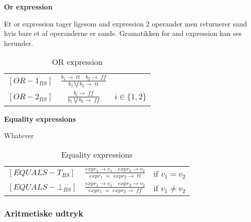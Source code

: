 \noindent\textbf{Or expression}

\noindent Et or expression tager ligesom and expression 2 operander men returnerer sand hvis bare et af operanderne er sande. Gramatikken for and expression kan ses herunder.



    \bgroup
    \def\arraystretch{3}
    \begin{table}[H]
    \centering
    \begin{tabular}{l c l}
        
        $[OR-1_{BS}]$ &$\frac{b_1 \rightarrow \; tt \quad b_2 \rightarrow \; ff}{b_1 \bigvee b_2 \rightarrow \; tt}$ & \\
    
        $[OR-2_{BS}]$ &$\frac{b_i \rightarrow \; ff}{b_1 \bigvee b_2 \rightarrow \; ff}$ & $i \in \{1, 2\}$\\
        
    \end{tabular}
    \caption{OR expression}
    \label{tab:orexpr}
    \end{table}
    \egroup
    
\textbf{Equality expressions}

\noindent\noindent Whatever
    
    


    \bgroup
    \def\arraystretch{3}
    \begin{table}[H]
    \centering
    \begin{tabular}{l c l}
        
        $[EQUALS-T_{BS}]$ &$\frac{expr_1 \rightarrow v_1 \quad expr_2 \rightarrow v_2}{expr_1\;=\;expr_2 \rightarrow \; tt}$ & if $v_1 = v_2$ \\
        
        $[EQUALS-\bot_{BS}]$ &$\frac{expr_1 \rightarrow v_1 \quad expr_2 \rightarrow v_2}{expr_1\;=\;expr_2 \rightarrow \; ff}$ & if $v_1 \ne v_2$ \\
        
    \end{tabular}
    \caption{Equality expressions}
    \label{tab:equaexpr}
    \end{table}
    \egroup

\noindent \subsubsection{Aritmetiske udtryk}

